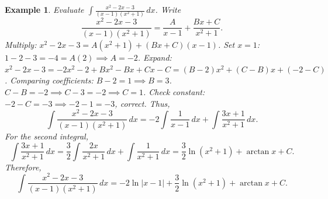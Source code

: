 \documentclass[11pt,a4paper]{article}
\newtheorem{example}{Example}
\begin{document}
\begin{example}
Evaluate $\displaystyle \int \frac{x^2 - 2x - 3}{(x-1)(x^2+1)} \, dx$.
Write
\[
\frac{x^2 - 2x - 3}{(x-1)(x^2+1)} = \frac{A}{x-1} + \frac{Bx + C}{x^2 + 1}.
\]
Multiply: $x^2 - 2x - 3 = A(x^2 + 1) + (Bx + C)(x - 1)$.
Set $x = 1$: $1 - 2 - 3 = -4 = A(2) \implies A = -2$.
Expand: $x^2 - 2x - 3 = -2x^2 - 2 + Bx^2 - Bx + Cx - C = (B - 2)x^2 + (C - B)x + (-2 - C)$.
Comparing coefficients:
$B - 2 = 1 \implies B = 3$.
$C - B = -2 \implies C - 3 = -2 \implies C = 1$.
Check constant: $-2 - C = -3 \implies -2 - 1 = -3$, correct.
Thus,
\[
\int \frac{x^2 - 2x - 3}{(x-1)(x^2+1)} \, dx = -2 \int \frac{1}{x-1} \, dx + \int \frac{3x + 1}{x^2 + 1} \, dx.
\]
For the second integral,
\[
\int \frac{3x + 1}{x^2 + 1} \, dx = \frac{3}{2} \int \frac{2x}{x^2 + 1} \, dx + \int \frac{1}{x^2 + 1} \, dx = \frac{3}{2} \ln(x^2 + 1) + \arctan x + C.
\]
Therefore,
\[
\int \frac{x^2 - 2x - 3}{(x-1)(x^2+1)} \, dx = -2\ln|x-1| + \frac{3}{2} \ln(x^2 + 1) + \arctan x + C.
\]
\end{example}
\end{document}
